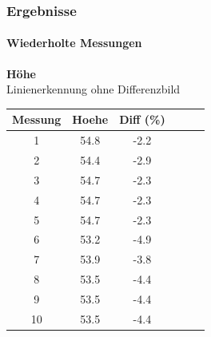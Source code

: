 \documentclass[xcolor=dvipsnames]{beamer}
\begin{document}
\begin{frame}
	\frametitle{Ergebnisse}
	\framesubtitle{Wiederholte Messungen}
		\textbf{Höhe}\\
		
		Linienerkennung ohne Differenzbild
		\begin{tabular}{c|c|c|c|c|c}
			Messung & Hoehe & Diff (\%) \\ \hline
1 & 54.8 &  -2.2 \\
2 & 54.4 &  -2.9 \\
3 & 54.7 &  -2.3 \\
4 & 54.7 &  -2.3 \\
5 & 54.7 &  -2.3 \\
6 & 53.2 &  -4.9 \\
7 & 53.9 &  -3.8 \\
8 & 53.5 &  -4.4 \\
9 & 53.5 &  -4.4 \\
10 & 53.5 & -4.4 \\


		\end{tabular}
		
\end{frame}
\end{document}
